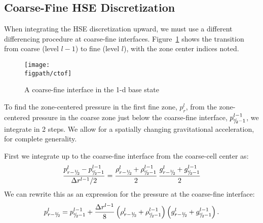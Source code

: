 \subsection{Coarse-Fine HSE Discretization}\label{Sec:Coarse-Fine HSE Discretization}
When integrating the HSE discretization upward, we must use a different
differencing procedure at coarse-fine interfaces.  Figure~\ref{fig:ctof} shows
the transition from coarse (level $l-1$) to fine (level $l$), with the zone
center indices noted.  
\begin{figure}[t]
\centering
\texttt{[image: \\figpath/ctof]}
\caption{\label{fig:ctof} A coarse-fine interface in the 1-d base state}
\end{figure}

To find the zone-centered pressure in the first fine zone, $p_r^l$, from
the zone-centered pressure in the coarse zone just below the coarse-fine interface,
$p_{\sfrac{r}{2}-1}^{l-1}$, we integrate in 2 steps.  We allow for a spatially
changing gravitational acceleration, for complete generality.

First we integrate up to the
coarse-fine interface from the coarse-cell center as:
\begin{equation}
\frac{p_{r-\myhalf}^l - p_{\sfrac{r}{2}-1}^{l-1}}{\Delta r^{l-1}/2} = 
  \frac{\rho_{r-\myhalf}^l + \rho_{\sfrac{r}{2}-1}^{l-1}}{2}  \,
  \frac{g_{r-\myhalf}^l + g_{\sfrac{r}{2}-1}^{l-1}}{2} 
\end{equation}
We can rewrite this as an expression for the pressure at the coarse-fine interface:
\begin{equation}
 p_{r-\myhalf}^l = p_{\sfrac{r}{2}-1}^{l-1} + \frac{\Delta r^{l-1}}{8}
  \left(\rho_{r-\myhalf}^l + \rho_{\sfrac{r}{2}-1}^{l-1}\right)
  \left(g_{r-\myhalf}^l + g_{\sfrac{r}{2}-1}^{l-1}\right).
  \label{eq:ctoi}
\end{equation}

